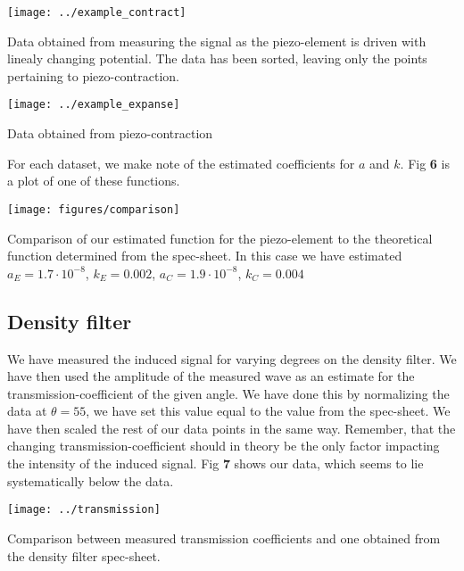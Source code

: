 \documentclass[working, oneside]{inputs/tuftebook}
\begin{document}
\begin{marginfigure}[-450pt]
	\texttt{[image: ../example\_contract]}
	\caption{Data obtained from measuring the signal as the piezo-element is driven with linealy changing potential. The data has been sorted, leaving only the points pertaining to piezo-contraction.}
\end{marginfigure}
\begin{marginfigure}[-250pt]
	\texttt{[image: ../example\_expanse]}
	\caption{Data obtained from piezo-contraction}
\end{marginfigure}
For each dataset, we make note of the estimated coefficients for $a$ and $k$. Fig  \textbf{6} is a plot of one of these functions. 
\begin{marginfigure}[-100pt]
	\texttt{[image: figures/comparison]}
	\caption{Comparison of our estimated function for the piezo-element to the theoretical function determined from the spec-sheet. In this case we have estimated $a_E = 1.7 \cdot 10^{-8}$, $k_E = 0.002$,  $a_C = 1.9 \cdot 10^{-8}$, $k_C = 0.004$}
\end{marginfigure}
\subsection*{Density filter}
We have measured the induced signal for varying degrees on the density filter. We have then used the amplitude of the measured wave as an estimate for the transmission-coefficient of the given angle. We have done this by normalizing the data at $\theta = 55$, we have set this value equal to the value from the spec-sheet. We have then scaled the rest of our data points in the same way. Remember, that the changing transmission-coefficient should in theory be the only factor impacting the intensity of the induced signal. Fig \textbf{7} shows our data, which seems to lie systematically below the data.
\begin{marginfigure}[-10pt]
	\texttt{[image: ../transmission]}
	\caption{Comparison between measured transmission coefficients and one obtained from the density filter spec-sheet.}
\end{marginfigure}
\end{document}
